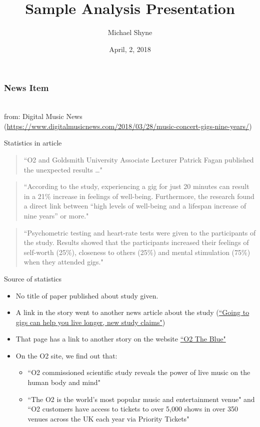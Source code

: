 \documentclass{beamer}
\title[Short title]{Sample Analysis Presentation}
\author[M. Shyne]{\Large Michael Shyne}
\date{April, 2, 2018}
\begin{document}
\frame{\titlepage}

\begin{frame}
\frametitle{News Item}
\\
\medskip
from: Digital Music News\\
\smallskip
(\url{https://www.digitalmusicnews.com/2018/03/28/music-concert-gigs-nine-years/})
\end{frame}

\begin{frame}{Statistics in article}
\begin{quote}
``O2 and Goldsmith University Associate Lecturer Patrick Fagan published the unexpected results \ldots" 
\end{quote}
\begin{quote}
``According to the study, experiencing a gig for just 20 minutes can result in a 21\% increase in feelings of well-being. Furthermore, the research found a direct link between “high levels of well-being and a lifespan increase of nine years” or more."
\end{quote}
{\centering
{}
\par}
\medskip
\begin{quote}
``Psychometric testing and heart-rate tests were given to the participants of the study. Results showed that the participants increased their feelings of self-worth (25\%), closeness to others (25\%) and mental stimulation (75\%) when they attended gigs."
\end{quote}
\end{frame}

\begin{frame}{Source of statistics}
\begin{itemize}
\item No title of paper published about study given.
\item A link in the story went to another news article about the study (\href{http://www.nme.com/news/music/going-to-gigs-can-help-you-live-longer-new-study-report-patrick-fagan-o2-2274410}{``Going to gigs can help you live longer, new study claims"})
\item That page has a link to another story on the website \href{https://news.o2.co.uk/press-release/science-says-gig-going-can-help-you-live-longer-and-increases-wellbeing/}{``O2 The Blue"}
\item On the O2 site, we find out that:
\begin{itemize}
\item ``O2 commissioned scientific study reveals the power of live music on the human body and mind"
\item ``The O2 is the world’s most popular music and entertainment venue" and ``O2 customers have access to tickets to over 5,000 shows in over 350 venues across the UK each year via Priority Tickets"
\end{itemize}
\end{itemize}
\end{frame}
\end{document}
